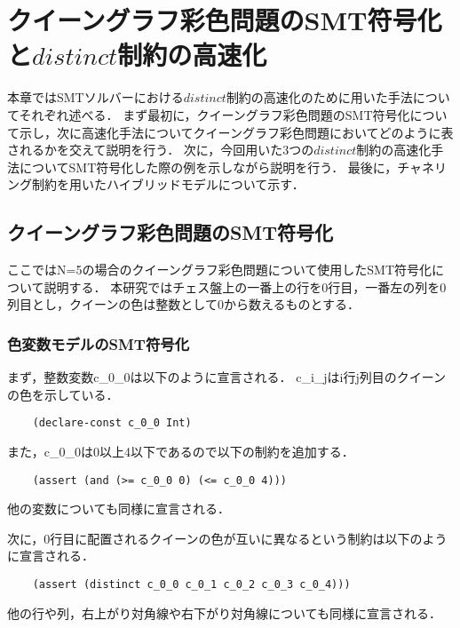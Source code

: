 \chapter{クイーングラフ彩色問題のSMT符号化と$distinct$制約の高速化}

本章ではSMTソルバーにおける$distinct$制約の高速化のために用いた手法についてそれぞれ述べる．
まず最初に，クイーングラフ彩色問題のSMT符号化について示し，次に高速化手法についてクイーングラフ彩色問題においてどのように表されるかを交えて説明を行う．
次に，今回用いた3つの$distinct$制約の高速化手法についてSMT符号化した際の例を示しながら説明を行う．
最後に，チャネリング制約を用いたハイブリッドモデルについて示す．

\section{クイーングラフ彩色問題のSMT符号化}
ここではN=5の場合のクイーングラフ彩色問題について使用したSMT符号化について説明する．
本研究ではチェス盤上の一番上の行を0行目，一番左の列を0列目とし，クイーンの色は整数として0から数えるものとする．


\subsection{色変数モデルのSMT符号化}
まず，整数変数c\_0\_0は以下のように宣言される．
c\_i\_jはi行j列目のクイーンの色を示している．
{ \footnotesize \begin{verbatim}
    (declare-const c_0_0 Int)
\end{verbatim}}
また，c\_0\_0は0以上4以下であるので以下の制約を追加する．
{ \footnotesize \begin{verbatim}
    (assert (and (>= c_0_0 0) (<= c_0_0 4)))
\end{verbatim}}
他の変数についても同様に宣言される．

次に，0行目に配置されるクイーンの色が互いに異なるという制約は以下のように宣言される．
{ \footnotesize \begin{verbatim}
    (assert (distinct c_0_0 c_0_1 c_0_2 c_0_3 c_0_4)))
\end{verbatim}}
他の行や列，右上がり対角線や右下がり対角線についても同様に宣言される．


